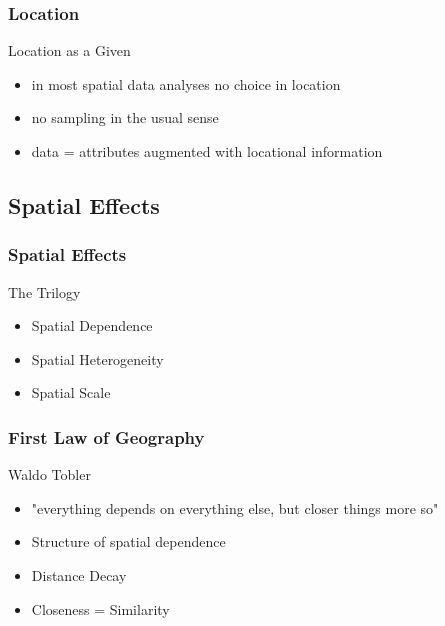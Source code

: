 \documentclass[nototal,handout]{beamer}
\begin{document}
\begin{frame}
	\frametitle{Location}
 
\begin{block}{Location as a \alert{Given}}
 \begin{itemize}
 \item  in most spatial data analyses no choice in location
 \item  no sampling in the usual sense
 \item  data = attributes augmented with \alert{locational} information
 \end{itemize}
 \end{block} \end{frame} 

 \subsection{Spatial Effects}

\begin{frame}
	\frametitle{Spatial Effects}
 
\begin{block}{The Trilogy}
 \begin{itemize}
 \item Spatial Dependence
 \item Spatial Heterogeneity
 \item Spatial Scale
 \end{itemize}
 \end{block} \end{frame} 

\begin{frame}
	\frametitle{First Law of Geography}
 
\begin{block}{Waldo Tobler}
 \begin{itemize}
 \item	"everything depends on everything else, but closer things more so"
 \item	Structure of spatial dependence
 \item	Distance Decay
 \item	Closeness = Similarity
 \end{itemize}
 \end{block} \end{frame} 
\end{document}
